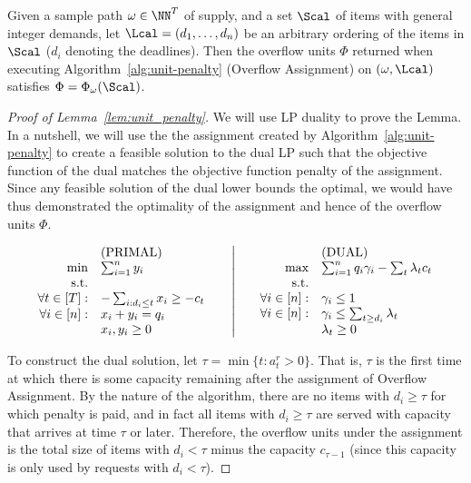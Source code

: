 \begin{lemma} 
	\label{lem:unit_penalty}
	Given a sample path $\omega \in \NN^{T}$ of supply, and a set $\Scal $ of items with general integer demands, let $\Lcal = (d_1, \ldots, d_n)$ be an arbitrary ordering of the items in $\Scal$ ($d_i$ denoting the deadlines). Then the overflow units $\Phi$ returned when executing Algorithm~\ref{alg:unit-penalty} ({\sc Overflow Assignment}) on $(\omega, \Lcal)$ satisfies $\Phi = \Phi_{\omega}({\Scal})$.
\end{lemma}
\begin{proof}[Proof of Lemma~\ref{lem:unit_penalty}]
    We will use LP duality to prove the Lemma. In a nutshell, we will use the the assignment created by Algorithm~\ref{alg:unit-penalty} to create a feasible solution to the dual LP such that the objective function of the dual matches the objective function  penalty of the assignment. Since any feasible solution of the dual lower bounds the optimal, we would have thus demonstrated the optimality of the assignment and hence of the overflow units $\Phi$. 

\begin{align*}
\begin{array}{rl}
& \mbox{(PRIMAL)} \\
\min & \sum_{i=1}^n y_i \\
\mbox{s.t.} &  \\
\forall t \in [T] : & -\sum_{i: d_i \leq t} x_i  \geq - c_t\\
\forall i \in [n]: & x_i + y_i = q_i \\
& x_i, y_i \geq 0
\end{array}
\hspace{0.2in}
\left|
\hspace{0.2in}
\begin{array}{rl}
& \mbox{(DUAL)} \\
\max & \sum_{i=1}^n q_i \gamma_i - \sum_{t} \lambda_t c_t  \\
\mbox{s.t.} & \\
\forall i \in [n]: & \gamma_i \leq 1 \\
\forall i \in [n]: & \gamma_i \leq  \sum_{t \geq d_i} \lambda_t \\
& \lambda_t \geq 0
\end{array}
\right.
\end{align*}

To construct the dual solution, let $\tau = \min \{ t : a_t^r > 0\}$. That is, $\tau$ is the first time at which there is some capacity remaining after the assignment of {\sc Overflow Assignment}. By the nature of the algorithm, there are no items with $d_i \geq \tau$ for which penalty is paid, and in fact all items with $d_i \geq \tau$ are served with capacity that arrives at time $\tau$ or later. Therefore, the overflow units under the assignment is the total size of items with $d_i < \tau$ minus the capacity $c_{\tau-1}$ (since this capacity is only used by requests with $d_i < \tau$).


\end{proof}
